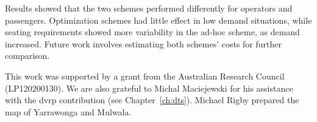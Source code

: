 Results showed that the two schemes performed differently for operators and
passengers. Optimization schemes had little effect in low demand situations, while
seating requirements showed more variability in the ad-hoc scheme, as demand
increased. Future work involves estimating  both schemes' costs for further
comparison.

This work was supported by a grant from the Australian Research Council (LP120200130). We are also grateful to Michal Maciejewski for his assistance with the \gls{dvrp} \gls{contribution} (see Chapter~\ref{ch:dts}). Michael Rigby prepared the map of Yarrawonga and Mulwala.
